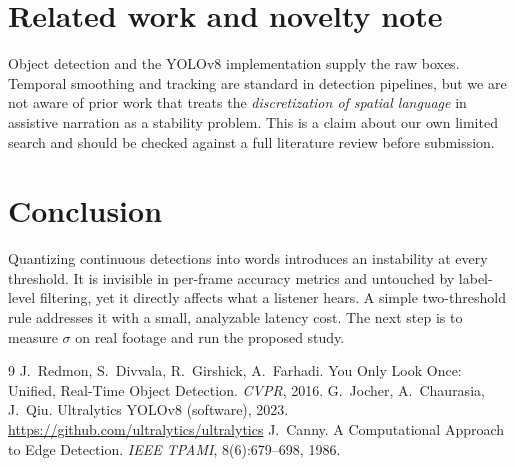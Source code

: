 \documentclass[11pt,a4paper]{article}
\begin{document}
\section{Related work and novelty note}
Object detection \cite{redmon2016} and the YOLOv8 implementation \cite{jocher2023} supply the raw boxes. Temporal smoothing and tracking are standard in detection pipelines, but we are not aware of prior work that treats the \emph{discretization of spatial language} in assistive narration as a stability problem. This is a claim about our own limited search and should be checked against a full literature review before submission.

\section{Conclusion}
Quantizing continuous detections into words introduces an instability at every threshold. It is invisible in per-frame accuracy metrics and untouched by label-level filtering, yet it directly affects what a listener hears. A simple two-threshold rule addresses it with a small, analyzable latency cost. The next step is to measure $\sigma$ on real footage and run the proposed study.

\begin{thebibliography}{9}
 J.~Redmon, S.~Divvala, R.~Girshick, A.~Farhadi. You Only Look Once: Unified, Real-Time Object Detection. \emph{CVPR}, 2016.
 G.~Jocher, A.~Chaurasia, J.~Qiu. Ultralytics YOLOv8 (software), 2023. \url{https://github.com/ultralytics/ultralytics}
 J.~Canny. A Computational Approach to Edge Detection. \emph{IEEE TPAMI}, 8(6):679--698, 1986.
\end{thebibliography}
\end{document}
